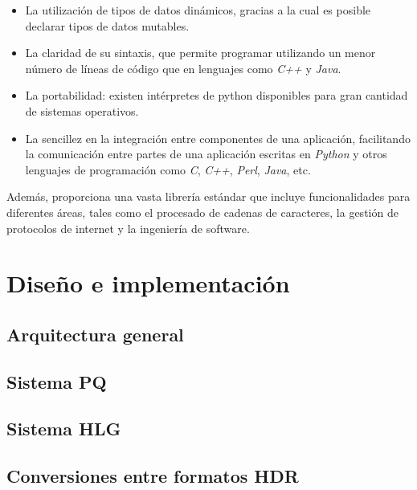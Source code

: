 \documentclass[a4paper, 12pt]{report}
\begin{document}
\begin{itemize}
  \item La utilización de tipos de datos dinámicos, gracias a la cual es posible declarar tipos de datos mutables.
  \item La claridad de su sintaxis, que permite programar utilizando un menor número de líneas de código que en lenguajes como \textit{C++} y \textit{Java}.

  \item La portabilidad: existen intérpretes de python disponibles para gran cantidad de sistemas operativos.
  \item La sencillez en la  integración entre componentes de una aplicación, facilitando la comunicación entre 
        partes de una aplicación escritas en  \textit{Python} y otros lenguajes de programación como \textit{C}, \textit{C++}, \textit{Perl}, \textit{Java}, etc.
\end{itemize}

Además, proporciona una vasta librería  estándar que incluye funcionalidades para  diferentes áreas, tales como el procesado de cadenas de caracteres, la gestión de protocolos de internet y la ingeniería de software.

\cleardoublepage
\chapter{Diseño e implementación}


\section{Arquitectura general} 
\label{sec:arquitectura}

\section{Sistema PQ} 
\label{sec:sistema_pq_tool}

\section{Sistema HLG} 
\label{sec:sistema_hlg_tool}

\section{Conversiones entre formatos HDR} 
\label{sec:conversiones_formatos_hdr}
\end{document}
